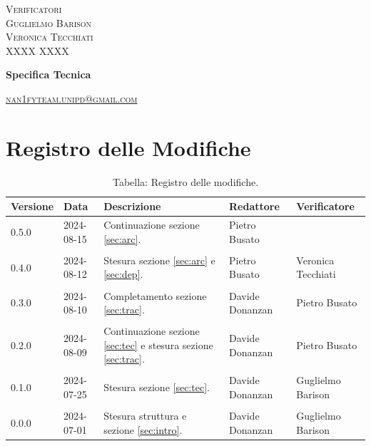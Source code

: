 \documentclass[8pt]{article}
\begin{document}
\begin{titlepage}
\begin{minipage}[t]{0.47\textwidth}
		{\large{\textsc{Verificatori}}
			\vspace{3mm}
			{\\\large{\textsc{Guglielmo Barison}\\}} 
			{\large{\textsc{Veronica Tecchiati}\\}} 
			{\large{\textsc{XXXX XXXX}\\}}
			
		}
		\vspace{2mm}\vspace{2mm}
	\end{minipage}
	\vspace{4cm}
	\begin{center}
		\begin{flushright}
			{\fontsize{30pt}{52pt}\selectfont \textbf{Specifica Tecnica}} %
		\end{flushright}
		\vspace{3cm}
	\end{center}
	\vspace{10 cm}
	{\small \textsc{\href{mailto: nan1fyteam.unipd@gmail.com}{nan1fyteam.unipd@gmail.com}}}
\end{titlepage}
\pagestyle{mystyle}
\section*{Registro delle Modifiche}
\begin{table}[ht!]	
	\centering
	\begin{tabular}{p{1.2cm} p{2cm} p{5cm} p{3cm} p{3cm}}
		\toprule
		\textbf{Versione}& \textbf{Data} & \textbf{Descrizione} & \textbf{Redattore} & \textbf{Verificatore} \\
		\midrule
  		    0.5.0 & 2024-08-15 & Continuazione sezione \ref{sec:arc}. & Pietro Busato &  \\\\
  		    0.4.0 & 2024-08-12 & Stesura sezione \ref{sec:arc} e \ref{sec:dep}. & Pietro Busato & Veronica Tecchiati \\\\
  		    0.3.0 & 2024-08-10 & Completamento sezione \ref{sec:trac}. & Davide Donanzan & Pietro Busato \\\\
  		    0.2.0 & 2024-08-09 & Continuazione sezione \ref{sec:tec} e stesura sezione \ref{sec:trac}. & Davide Donanzan & Pietro Busato \\\\
		    0.1.0 & 2024-07-25 & Stesura sezione \ref{sec:tec}. & Davide Donanzan & Guglielmo Barison \\\\
    		0.0.0 & 2024-07-01 & Stesura struttura e sezione \ref{sec:intro}. & Davide Donanzan & Guglielmo Barison \\
		\bottomrule
	\end{tabular}
	\caption*{Tabella: Registro delle modifiche.}
	\label{table:Registro delle modifiche}
\end{table}
\newpage
\tableofcontents
\newpage
\listoffigures
\newpage
\listoftables
\newpage
\justifying
\end{document}
